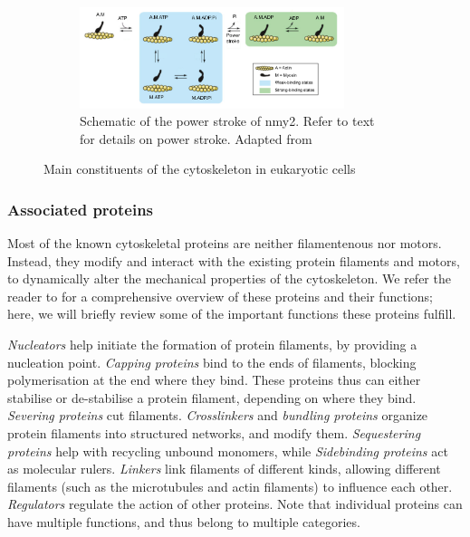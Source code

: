 \begin{figure}[p]
\begin{subfigure}{\textwidth}
    \label{subfig:cytoskeletonMainConsituents-myosin}
\end{subfigure}
\hfill
\begin{subfigure}{\textwidth}
    \centering
    \includegraphics[width=0.85\textwidth]{Introduction/FigureCytoskeleton/powerstroke.pdf}
    \caption{Schematic of the power stroke of \acs{nmy2}. Refer to text for details on power stroke. Adapted from \cite{de2004relating}}
    \label{subfig:cytoskeletonMainConsituents-powerstroke}
\end{subfigure}

\caption[Main constituents of the cytoskeleton]{Main constituents of the cytoskeleton in eukaryotic cells}
\label{fig:cytoskeletonMainConsituents}

\end{figure}

\subsubsection{Associated proteins}\label{subsubsec:AssociatedProteinsCytoskeleton}
Most of the known cytoskeletal proteins are neither filamentenous nor motors. Instead, they modify and interact with the existing protein filaments and motors, to dynamically alter the mechanical properties of the cytoskeleton. We refer the reader to \cite{chaffey2003alberts,pollard1986actin} for a comprehensive overview of these proteins and their functions; here, we will briefly review some of the important functions these proteins fulfill.

\textit{Nucleators} help initiate the formation of protein filaments, by providing a nucleation point. \textit{Capping proteins} bind to the ends of filaments, blocking polymerisation at the end where they bind. These proteins thus can either stabilise or de-stabilise a protein filament, depending on where they bind. \textit{Severing proteins} cut filaments. \textit{Crosslinkers} and \textit{bundling proteins} organize protein filaments into structured networks, and modify them. \textit{Sequestering proteins} help with recycling unbound monomers, while \textit{Sidebinding proteins} act as molecular rulers. \textit{Linkers} link filaments of different kinds, allowing different filaments (such as the microtubules and actin filaments) to influence each other. \textit{Regulators} regulate the action of other proteins. Note that individual proteins can have multiple functions, and thus belong to multiple categories.

